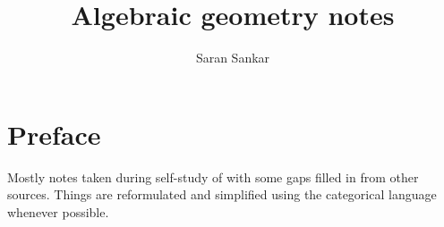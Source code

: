 \documentclass[12pt, oneside]{scrbook}
\theoremstyle{definition}
\theoremstyle{exmp}
\begin{document}
\author{Saran Sankar}
\title{Algebraic geometry notes}
\date{}
\maketitle

\chapter*{Preface}


Mostly notes taken during self-study of \cite{shafarevich2013basic} with some gaps filled in from other sources.  Things are reformulated and simplified using the categorical language whenever possible.

\tableofcontents





\printbibliography
\end{document}
